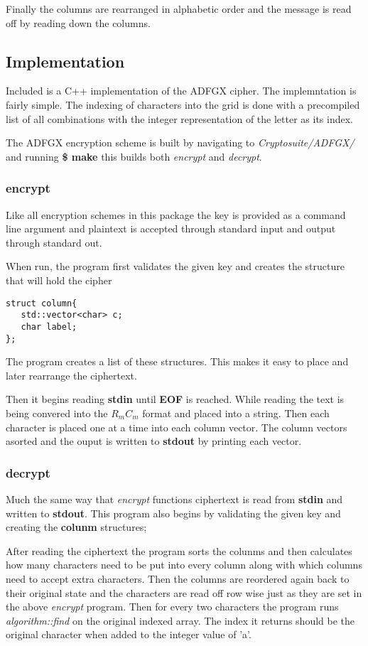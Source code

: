 Finally the columns are rearranged in alphabetic order and the message is read off by reading down the columns.

\subsection{ Implementation }

Included is a C++ implementation of the ADFGX cipher.
The implemntation is fairly simple. 
The indexing of characters into the grid is done with a precompiled list of all combinations with the integer representation of the letter as its index.

The ADFGX encryption scheme is built by navigating to \textit{Cryptosuite/ADFGX/} and running \textbf{\$ make} this builds both \textit{encrypt} and \textit{decrypt}.

\subsubsection{encrypt}

Like all encryption schemes in this package the key is provided as a command line argument and plaintext is accepted through standard input and output through standard out. 

When run, the program first validates the given key and creates the structure that will hold the cipher

\begin{verbatim}
struct column{
   std::vector<char> c;
   char label;
};
\end{verbatim}

The program creates a list of these structures. This makes it easy to place and later rearrange the ciphertext.

Then it begins reading \textbf{stdin} until \textbf{EOF} is reached.
While reading the text is being convered into the $R_mC_m$ format and placed into a string.
Then each character is placed one at a time into each column vector. The column vectors asorted and the ouput is written to \textbf{stdout} by printing each vector.

\subsubsection{decrypt}

Much the same way that \textit{encrypt} functions ciphertext is read from \textbf{stdin} and written to \textbf{stdout}.
This program also begins by validating the given key and creating the \textbf{colunm} structures;

After reading the ciphertext the program sorts the colunms and then calculates how many characters need to be put into every column along with which columns need to accept extra characters.
Then the columns are reordered again back to their original state and the characters are read off row wise just as they are set in the above \textit{encrypt} program.
Then for every two characters the program runs \textit{algorithm::find} on the original indexed array. The index it returns should be the original character when added to the integer value of 'a'.

